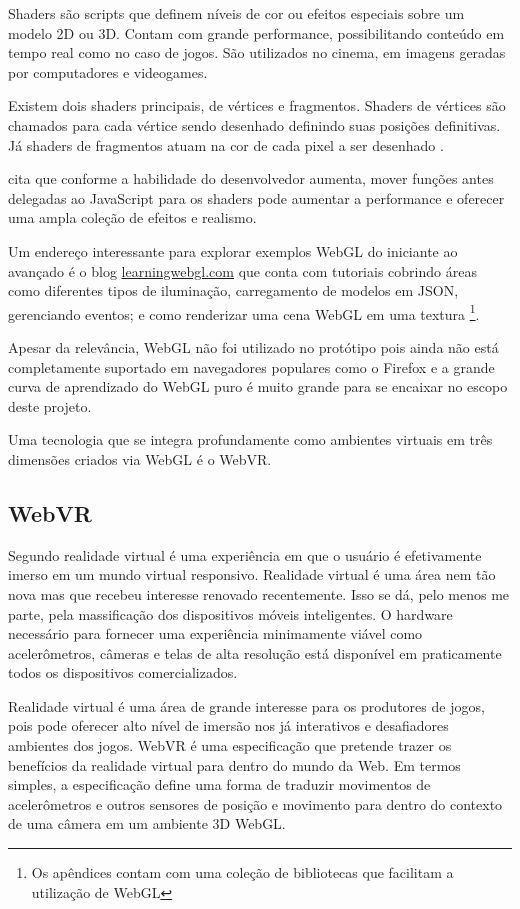 Shaders são scripts que definem níveis de cor ou efeitos especiais
sobre um modelo 2D ou 3D. Contam com grande performance, possibilitando
conteúdo em tempo real como no caso de jogos. São utilizados no
cinema, em imagens geradas por computadores e videogames.

Existem dois shaders principais, de vértices e fragmentos. Shaders de
vértices são chamados para cada vértice sendo desenhado definindo
suas posições definitivas. Já shaders de fragmentos atuam na cor de
cada pixel a ser desenhado \autocite[p.15]{3daps}.

\citet{html5mostwanted} cita que conforme a habilidade do desenvolvedor
aumenta, mover funções antes delegadas ao JavaScript para os shaders
pode aumentar a performance e oferecer uma ampla coleção de efeitos e
realismo.

Um endereço interessante para explorar exemplos WebGL do iniciante ao avançado é o blog
 \url{learningwebgl.com} que conta com tutoriais cobrindo áreas
como diferentes tipos de iluminação, carregamento de modelos em JSON,
gerenciando eventos; e como renderizar uma cena WebGL
em uma textura \autocite[p.42]{3daps}\footnote{Os apêndices contam
com uma coleção de bibliotecas que facilitam a utilização de WebGL}.

Apesar da relevância, WebGL não foi utilizado no protótipo pois
ainda não está completamente suportado em navegadores populares como
o Firefox e a grande curva de aprendizado do WebGL puro é muito grande
para se encaixar no escopo deste projeto.

Uma tecnologia que se integra profundamente como ambientes virtuais
em três dimensões criados via WebGL é o WebVR.
\subsection{WebVR}
Segundo \citet{virtualReality} realidade virtual é uma experiência em
que o usuário é efetivamente imerso em um mundo virtual responsivo.
Realidade virtual é uma área nem tão nova mas que recebeu interesse
renovado recentemente. Isso se dá, pelo menos me parte, pela
massificação dos dispositivos móveis inteligentes. O hardware
necessário para fornecer uma experiência minimamente viável como
acelerômetros, câmeras e telas de alta resolução está disponível
em praticamente todos os dispositivos comercializados.

Realidade virtual é uma área de grande interesse para os produtores de
jogos, pois pode oferecer alto nível de imersão nos já interativos
e desafiadores ambientes dos jogos. WebVR é uma especificação que
pretende trazer os benefícios da realidade virtual para dentro do mundo
da Web. Em termos simples, a especificação define uma forma de traduzir
movimentos de acelerômetros e outros sensores de posição e movimento
para dentro do contexto de uma câmera em um ambiente 3D WebGL.

